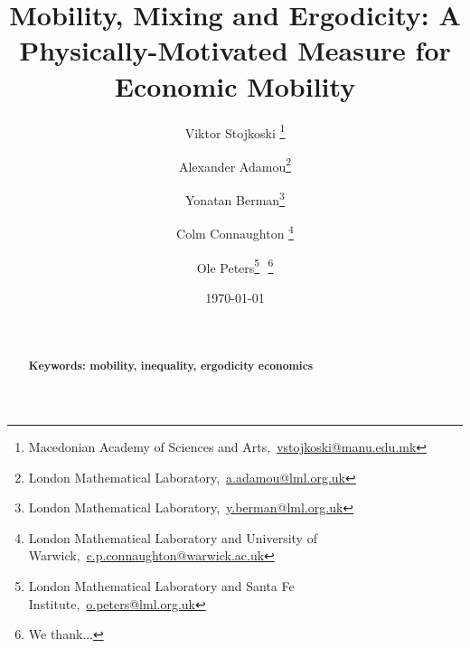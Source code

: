\documentclass[11pt]{article}
\newcommand{\bc}{\begin{center}}
\newcommand{\ec}{\end{center}}
\newcommand{\red}[1]{{\color{red} #1}}
\numberwithin{equation}{section}
\begin{document}
\begin{titlepage}
\title{Mobility, Mixing and Ergodicity: A Physically-Motivated Measure for Economic Mobility}
\author{Viktor Stojkoski \footnote{Macedonian Academy of Sciences and Arts,~\url{vstojkoski@manu.edu.mk}} \and Alexander Adamou\footnote{London Mathematical Laboratory,~\url{a.adamou@lml.org.uk}} \and Yonatan Berman\footnote{London Mathematical Laboratory,~\url{y.berman@lml.org.uk}} \and Colm Connaughton \footnote{London Mathematical Laboratory and University of Warwick,~\url{c.p.connaughton@warwick.ac.uk}} \and Ole Peters\footnote{London Mathematical Laboratory and Santa Fe Institute,~\url{o.peters@lml.org.uk}}\,\, \thanks{We thank...}}
\date{\today}
\maketitle
\begin{abstract}
\noindent 
\\
\\
\noindent\textbf{Keywords: mobility, inequality, ergodicity economics}
\end{abstract}
\setcounter{page}{0}
\thispagestyle{empty}
\end{titlepage}
\pagebreak \newpage
\end{document}
